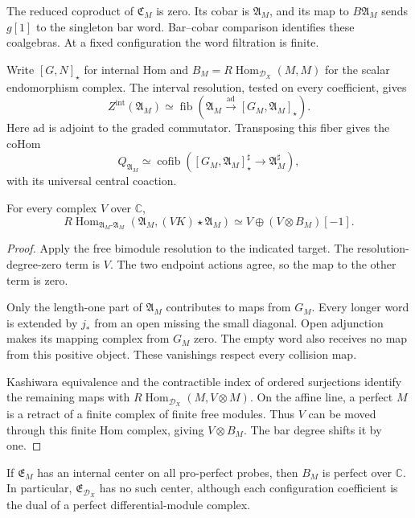 The reduced coproduct of
$\mathfrak C_M$ is zero.
Its cobar is $\mathfrak A_M$, and
its map to $B\mathfrak A_M$ sends
$g[1]$ to the singleton bar word.
Bar--cobar comparison identifies
these coalgebras. At a fixed
configuration the word filtration
is finite.

Write $[G,N]_\star$ for internal
Hom and
$B_M=R\operatorname{Hom}_{\mathcal D_X}(M,M)$
for the scalar endomorphism complex.
The interval resolution, tested on
every coefficient, gives
\[
 Z^{\mathrm{int}}(\mathfrak A_M)
 \simeq
 \operatorname{fib}\left(
 \mathfrak A_M\xrightarrow{\mathrm{ad}}
       [G_M,\mathfrak A_M]_\star\right).
\]
Here $\mathrm{ad}$ is adjoint to
the graded commutator. Transposing
this fiber gives the coHom
\[
 Q_{\mathfrak A_M}\simeq
 \operatorname{cofib}\left(
 [G_M,\mathfrak A_M]_\star^\sharp
 \longrightarrow\mathfrak A_M^\sharp\right),
\]
with its universal central coaction.

\begin{lemma}\label{v4-arith:centers:lem:current-test}
For every complex $V$ over $\mathbb C$,
\[
 R\operatorname{Hom}_{\mathfrak A_M\text{-}\mathfrak A_M}
       (\mathfrak A_M,(VK)\star\mathfrak A_M)
 \simeq V\oplus(V\otimes B_M)[-1].
\]
\end{lemma}

\begin{proof}
Apply the free bimodule resolution
to the indicated target. The
resolution-degree-zero term is $V$.
The two endpoint actions agree, so
the map to the other term is zero.

Only the length-one part of
$\mathfrak A_M$ contributes to
maps from $G_M$. Every longer
word is extended by $j_*$ from
an open missing the small diagonal.
Open adjunction makes its mapping
complex from $G_M$ zero.
The empty word also receives no
map from this positive object.
These vanishings respect every
collision map.

Kashiwara equivalence and the
contractible index of ordered
surjections identify the remaining
maps with
$R\operatorname{Hom}_{\mathcal D_X}(M,V\otimes M)$.
On the affine line, a perfect $M$
is a retract of a finite complex
of finite free modules. Thus $V$
can be moved through this finite
Hom complex, giving $V\otimes B_M$.
The bar degree shifts it by one.
\end{proof}

\begin{theorem}\label{v4-arith:centers:thm:current-obstruction}
If $\mathfrak E_M$ has an internal
center on all pro-perfect probes,
then $B_M$ is perfect over $\mathbb C$.
In particular, $\mathfrak E_{\mathcal D_X}$
has no such center, although each
configuration coefficient is the
dual of a perfect differential-module
complex.
\end{theorem}

